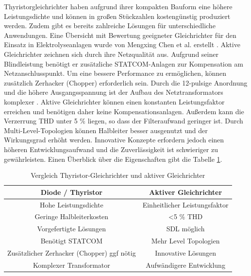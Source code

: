 Thyristorgleichrichter haben aufgrund ihrer kompakten Bauform eine höhere Leistungsdichte und können in großen Stückzahlen kostengünstig produziert werden. Zudem gibt es bereits zahlreiche Lösungen für unterschiedliche Anwendungen. Eine Übersicht mit Bewertung geeigneter Gleichrichter für den Einsatz in Elektrolyseanlagen wurde von Mengxing Chen et al. erstellt \cite{HydrogenElectronicTopologies}. Aktive Gleichrichter zeichnen sich durch ihre Netzqualität aus. Aufgrund seiner Blindleistung benötigt er zusätzliche STATCOM-Anlagen zur Kompensation am Netzanschlusspunkt. Um eine bessere Performance zu ermöglichen, können zusätzlich Zerhacker (Chopper) erforderlich sein. Durch die 12-pulsige Anordnung und die höhere Ausgangsspannung ist der Aufbau des Netztransformators komplexer \cite{HydrogenRectInf}. Aktive Gleichrichter können einen konstanten Leistungsfaktor erreichen und benötigen daher keine Kompensationsanlagen. Außerdem kann die Verzerrung \gls{THD} unter 5 \% liegen, so dass der Filteraufwand geringer ist. Durch Multi-Level-Topologien können Halbleiter besser ausgenutzt und der Wirkungsgrad erhöht werden. Innovative Konzepte erfordern jedoch einen höheren Entwicklungsaufwand und die Zuverlässigkeit ist schwieriger zu gewährleisten. Einen Überblick über die Eigenschaften gibt die Tabelle \ref{tab:thyVSafe}.\\
	\begin{table} [H]
		\centering
		\caption{Vergleich Thyristor-Gleichrichter und aktiver Gleichrichter}
		\label{tab:thyVSafe}
		\begin{tabular}{|c|c|} 
			\hline
			\textbf{Diode / Thyristor} & \textbf{Aktiver Gleichrichter} \\
			\hline
			Hohe Leistungsdichte & Einheitlicher Leistungsfaktor \\
			\hline
			Geringe Halbleiterkosten & <5 \% \gls{THD} \\
			\hline
			Vorgefertigte Lösungen &  \gls{SDL} möglich \\
			\hline
			Benötigt STATCOM & Mehr Level Topologien  \\
			\hline
			Zusätzlicher Zerhacker (Chopper) ggf  nötig & Innovative Lösungen \\
			\hline
			Komplexer Transformator & Aufwändigere Entwicklung \\
			\hline
		\end{tabular}
	\end{table}
